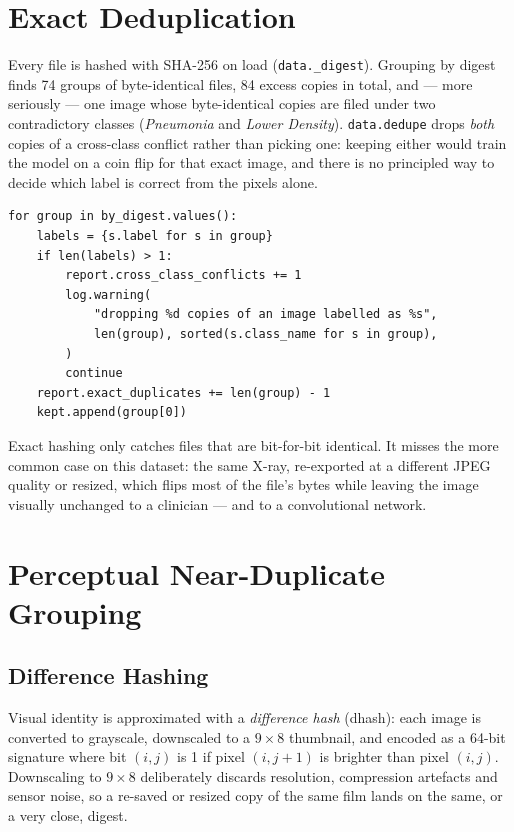 \documentclass[11pt,a4paper,oneside]{report}
\newcommand{\code}[1]{\texttt{\small #1}}
\begin{document}
\section{Exact Deduplication}
\label{sec:exact-dedup}

Every file is hashed with SHA-256 on load (\code{data.\_digest}). Grouping by
digest finds 74 groups of byte-identical files, 84 excess copies in total,
and --- more seriously --- one image whose byte-identical copies are filed
under two contradictory classes (\emph{Pneumonia} and \emph{Lower Density}).
\code{data.dedupe} drops \emph{both} copies of a cross-class conflict rather
than picking one: keeping either would train the model on a coin flip for
that exact image, and there is no principled way to decide which label is
correct from the pixels alone.

\begin{lstlisting}[caption={Cross-class conflicts are dropped entirely, not
resolved by a heuristic (\texttt{lxnet/data.py}).}, label=lst:dedupe]
for group in by_digest.values():
    labels = {s.label for s in group}
    if len(labels) > 1:
        report.cross_class_conflicts += 1
        log.warning(
            "dropping %d copies of an image labelled as %s",
            len(group), sorted(s.class_name for s in group),
        )
        continue
    report.exact_duplicates += len(group) - 1
    kept.append(group[0])
\end{lstlisting}

Exact hashing only catches files that are bit-for-bit identical. It misses
the more common case on this dataset: the same X-ray, re-exported at a
different JPEG quality or resized, which flips most of the file's bytes while
leaving the image visually unchanged to a clinician --- and to a
convolutional network.

\section{Perceptual Near-Duplicate Grouping}
\label{sec:perceptual-grouping}

\subsection{Difference Hashing}

Visual identity is approximated with a \emph{difference hash} (dhash): each
image is converted to grayscale, downscaled to a $9\times8$ thumbnail, and
encoded as a 64-bit signature where bit $(i,j)$ is 1 if pixel $(i, j{+}1)$ is
brighter than pixel $(i, j)$. Downscaling to $9\times 8$ deliberately
discards resolution, compression artefacts and sensor noise, so a re-saved or
resized copy of the same film lands on the same, or a very close, digest.
\end{document}
